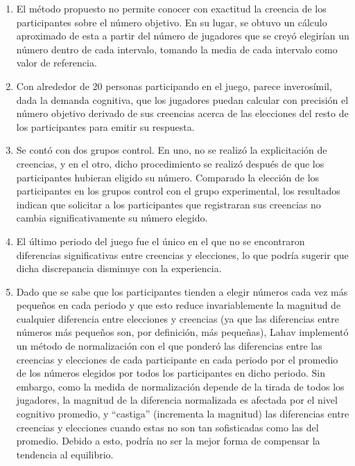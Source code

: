 \begin{enumerate}
\item El método propuesto no permite conocer con exactitud la creencia de los participantes sobre el número objetivo. En su lugar, se obtuvo un cálculo aproximado de esta a partir del número de jugadores que se creyó elegirían un número dentro de cada intervalo, tomando la media de cada intervalo como valor de referencia.\\

\item Con alrededor de 20 personas participando en el juego, parece inverosímil, dada la demanda cognitiva, que los jugadores puedan calcular con precisión el número objetivo derivado de sus creencias acerca de las elecciones del resto de los participantes para emitir su respuesta.\\

\item Se contó con dos grupos control. En uno, no se realizó la explicitación de creencias, y en el otro, dicho procedimiento se realizó después de que los participantes hubieran eligido su número. Comparado la elección de los participantes en los grupos control con el grupo experimental, los resultados indican que solicitar a los participantes que registraran sus creencias no cambia significativamente  su número elegido.\\

\item El último periodo del juego fue el único en el que no se encontraron diferencias significativas entre creencias y elecciones, lo que podría sugerir que dicha discrepancia disminuye con la experiencia.\\

\item Dado que se sabe que los participantes tienden a elegir números cada vez más pequeños en cada periodo y que esto reduce invariablemente la magnitud de cualquier diferencia entre elecciones y creencias (ya que las diferencias entre números más pequeños son, por definición, más pequeñas), Lahav implementó un método de normalización con el que ponderó las diferencias entre las creencias y elecciones de cada participante en cada periodo por el promedio de los números elegidos por todos los participantes en dicho periodo. Sin embargo, como la medida de normalización depende de la tirada de todos los jugadores, la magnitud de la diferencia normalizada es afectada por el nivel cognitivo promedio, y “castiga” (incrementa la magnitud) las diferencias entre creencias y elecciones cuando estas no son tan sofisticadas como las del promedio. Debido a esto, podría no ser la mejor forma de compensar la tendencia al equilibrio.\\
\end{enumerate}

